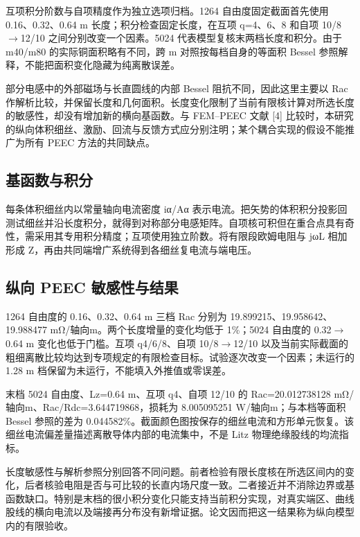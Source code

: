 \documentclass[11pt]{article}
\begin{document}
互项积分阶数与自项精度作为独立选项归档。1264 自由度固定截面首先使用 0.16、0.32、0.64 m 长度；积分检查固定长度，在互项 q=4、6、8 和自项 10/8\(\to\)12/10 之间分别改变一个因素。5024 代表模型复核末两档长度和积分。由于 m40/m80 的实际铜面积略有不同，跨 m 对照按每档自身的等面积 Bessel 参照解释，不能把面积变化隐藏为纯离散误差。


部分电感中的外部磁场与长直圆线的内部 Bessel 阻抗不同，因此这里主要以 Rac 作解析比较，并保留长度和几何面积。长度变化限制了当前有限核计算对所选长度的敏感性，却没有增加新的横向基函数。与 FEM–PEEC 文献 [4] 比较时，本研究的纵向体积细丝、激励、回流与反馈方式应分别注明；某个耦合实现的假设不能推广为所有 PEEC 方法的共同缺点。


\subsection*{基函数与积分}
\hypertarget{06.peec_derivation.heading}{}
每条体积细丝内以常量轴向电流密度 iα/Aα 表示电流。把矢势的体积积分投影回测试细丝并沿长度积分，就得到对称部分电感矩阵。自项核可积但在重合点具有奇性，需采用其专用积分精度；互项使用独立阶数。将有限段欧姆电阻与 jωL 相加形成 Z，再由共同端增广系统得到各细丝复电流与端电压。


\subsection*{纵向 PEEC 敏感性与结果}
\hypertarget{06.peec_results.heading}{}
1264 自由度的 0.16、0.32、0.64 m 三档 Rac 分别为 19.899215、19.958642、19.988477 mΩ/轴向m。两个长度增量的变化均低于 1\%；5024 自由度的 0.32\(\to\)0.64 m 变化也低于门槛。互项 q4/6/8、自项 10/8\(\to\)12/10 以及当前实际截面的粗细离散比较均达到专项规定的有限检查目标。试验逐次改变一个因素；未运行的 1.28 m 档保留为未运行，不能填入外推值或零误差。


末档 5024 自由度、Lz=0.64 m、互项 q4、自项 12/10 的 Rac=20.012738128 mΩ/轴向m、Rac/Rdc=3.644719868，损耗为 8.005095251 W/轴向m；与本档等面积 Bessel 参照的差为 0.044582\%。截面颜色图按保存的细丝电流和方形单元恢复。该细丝电流偏差量描述离散导体内部的电流集中，不是 Litz 物理绝缘股线的均流指标。


长度敏感性与解析参照分别回答不同问题。前者检验有限长度核在所选区间内的变化，后者核验电阻是否与可比较的长直内场尺度一致。二者接近并不消除边界或基函数缺口。特别是末档的很小积分变化只能支持当前积分实现，对真实端区、曲线股线的横向电流以及端接再分布没有新增证据。论文因而把这一结果称为纵向模型内的有限验收。
\end{document}
